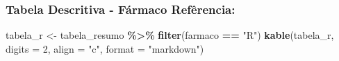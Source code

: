 \documentclass[
]{article}
\newenvironment{Shaded}{\begin{snugshade}}{\end{snugshade}}
\newcommand{\AttributeTok}[1]{\textcolor[rgb]{0.13,0.29,0.53}{#1}}
\newcommand{\DecValTok}[1]{\textcolor[rgb]{0.00,0.00,0.81}{#1}}
\newcommand{\FunctionTok}[1]{\textcolor[rgb]{0.13,0.29,0.53}{\textbf{#1}}}
\newcommand{\NormalTok}[1]{#1}
\newcommand{\OtherTok}[1]{\textcolor[rgb]{0.56,0.35,0.01}{#1}}
\newcommand{\SpecialCharTok}[1]{\textcolor[rgb]{0.81,0.36,0.00}{\textbf{#1}}}
\newcommand{\StringTok}[1]{\textcolor[rgb]{0.31,0.60,0.02}{#1}}
\begin{document}
\hypertarget{tabela-descritiva---fuxe1rmaco-refuxearencia}{%
\subsubsection{Tabela Descritiva - Fármaco
Refêrencia:}\label{tabela-descritiva---fuxe1rmaco-refuxearencia}}

\begin{Shaded}
\begin{Highlighting}[]
\NormalTok{tabela\_r }\OtherTok{\textless{}{-}}\NormalTok{ tabela\_resumo }\SpecialCharTok{\%\textgreater{}\%} 
  \FunctionTok{filter}\NormalTok{(farmaco }\SpecialCharTok{==} \StringTok{"R"}\NormalTok{)}
\FunctionTok{kable}\NormalTok{(tabela\_r, }\AttributeTok{digits =} \DecValTok{2}\NormalTok{, }\AttributeTok{align =} \StringTok{"c"}\NormalTok{, }\AttributeTok{format =} \StringTok{"markdown"}\NormalTok{)}
\end{Highlighting}
\end{Shaded}
\end{document}

